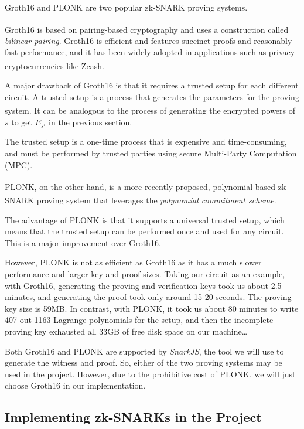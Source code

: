 \documentclass[
]{report}
\begin{document}
Groth16 and PLONK are two popular zk-SNARK proving systems.

Groth16\textsuperscript{\cite{cryptoeprint:2016/260}} is based on
pairing-based cryptography and uses a construction
called \emph{bilinear pairing}. Groth16 is efficient and features
succinct proofs and reasonably fast performance, and it has been widely
adopted in applications such as privacy cryptocurrencies like Zcash\textsuperscript{\cite{Groth16Intro,Groth16Blog}}.

A major drawback of Groth16 is that it requires a trusted setup for each
different circuit. A trusted setup is a process that generates the
parameters for the proving system\textsuperscript{\cite{trusted-setup}}.
It can be analogous to the process of
generating the encrypted powers of \(s\) to get \(E_{s^{i}}\) in the
previous section.

The trusted setup is a one-time process that is expensive and
time-consuming, and must be performed by trusted parties using secure
Multi-Party Computation (MPC).

PLONK\textsuperscript{\cite{cryptoeprint:2019/953}}, on the other hand,
is a more recently proposed, polynomial-based
zk-SNARK proving system that leverages the \emph{polynomial commitment
scheme}\textsuperscript{\cite{plonk}}.

The advantage of PLONK is that it supports a universal trusted setup,
which means that the trusted setup can be performed once and used for
any circuit. This is a major improvement over Groth16.

However, PLONK is not as efficient as Groth16 as it has a much slower
performance and larger key and proof sizes. Taking our circuit as an
example, with Groth16, generating the proving and verification keys took
us about 2.5 minutes, and generating the proof took only around 15-20
seconds. The proving key size is 59MB. In contrast, with PLONK, it took
us about 80 minutes to write 407 out 1163 Lagrange polynomials for the
setup, and then the incomplete proving key exhausted all 33GB of free
disk space on our machine\ldots{}

Both Groth16 and PLONK are supported by \emph{SnarkJS}, the tool we will
use to generate the witness and proof. So, either of the two proving
systems may be used in the project. However, due to the prohibitive cost
of PLONK, we will just choose Groth16 in our implementation.

\subsection{Implementing zk-SNARKs in the Project}
\end{document}
